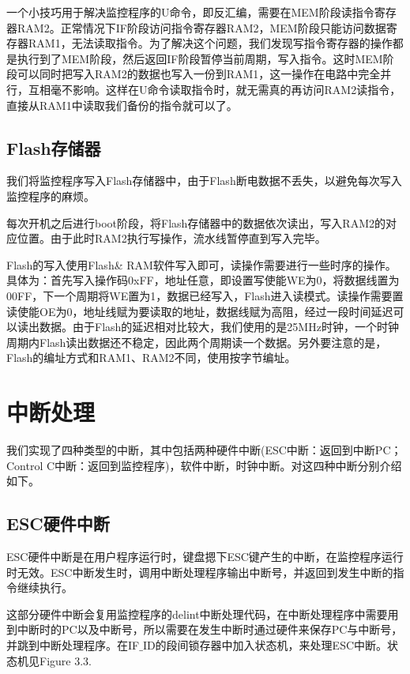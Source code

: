 一个小技巧用于解决监控程序的U命令，即反汇编，需要在MEM阶段读指令寄存器RAM2。正常情况下IF阶段访问指令寄存器RAM2，MEM阶段只能访问数据寄存器RAM1，无法读取指令。为了解决这个问题，我们发现写指令寄存器的操作都是执行到了MEM阶段，然后返回IF阶段暂停当前周期，写入指令。这时MEM阶段可以同时把写入RAM2的数据也写入一份到RAM1，这一操作在电路中完全并行，互相毫不影响。这样在U命令读取指令时，就无需真的再访问RAM2读指令，直接从RAM1中读取我们备份的指令就可以了。

\subsection{Flash存储器}
我们将监控程序写入Flash存储器中，由于Flash断电数据不丢失，以避免每次写入监控程序的麻烦。

每次开机之后进行boot阶段，将Flash存储器中的数据依次读出，写入RAM2的对应位置。由于此时RAM2执行写操作，流水线暂停直到写入完毕。

Flash的写入使用Flash\& RAM软件写入即可，读操作需要进行一些时序的操作。具体为：首先写入操作码0xFF，地址任意，即设置写使能WE为0，将数据线置为00FF，下一个周期将WE置为1，数据已经写入，Flash进入读模式。读操作需要置读使能OE为0，地址线赋为要读取的地址，数据线赋为高阻，经过一段时间延迟可以读出数据。由于Flash的延迟相对比较大，我们使用的是25MHz时钟，一个时钟周期内Flash读出数据还不稳定，因此两个周期读一个数据。另外要注意的是，Flash的编址方式和RAM1、RAM2不同，使用按字节编址。



\section{中断处理}

我们实现了四种类型的中断，其中包括两种硬件中断(ESC中断：返回到中断PC；Control C中断：返回到监控程序)，软件中断，时钟中断。对这四种中断分别介绍如下。

\subsection{ESC硬件中断}

ESC硬件中断是在用户程序运行时，键盘摁下ESC键产生的中断，在监控程序运行时无效。ESC中断发生时，调用中断处理程序输出中断号，并返回到发生中断的指令继续执行。

这部分硬件中断会复用监控程序的delint中断处理代码，在中断处理程序中需要用到中断时的PC以及中断号，所以需要在发生中断时通过硬件来保存PC与中断号，并跳到中断处理程序。在IF$\_$ID的段间锁存器中加入状态机，来处理ESC中断。状态机见Figure 3.3.


